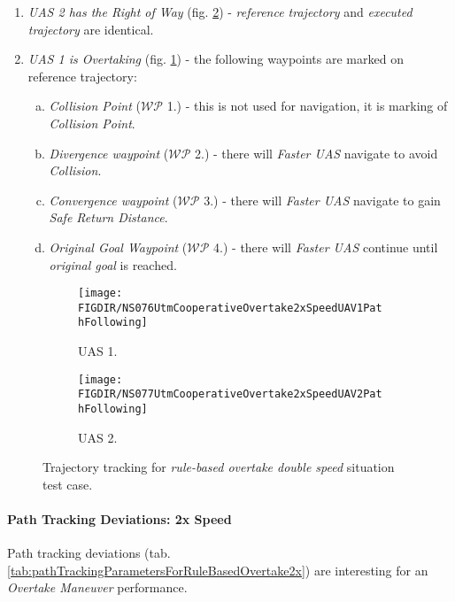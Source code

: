     \begin{enumerate}
        \item \emph{UAS 2 has the Right of Way} (fig. \ref{fig:ruleBasedOvertake2xPathTrackingUAS2}) - \emph{reference trajectory} and \emph{executed trajectory} are identical. 
        
        \item \emph{UAS 1 is Overtaking} (fig. \ref{fig:ruleBasedOvertake2xdPathTrackingUAS1}) - the following waypoints are marked on reference trajectory:
        \begin{enumerate}[a.]
            \item \emph{Collision Point} ($\mathscr{WP}$ 1.) - this is not used for navigation, it is marking of \emph{Collision Point}.
            \item \emph{Divergence waypoint} ($\mathscr{WP}$ 2.) - there will \emph{Faster UAS} navigate to avoid \emph{Collision}.
            \item \emph{Convergence waypoint} ($\mathscr{WP}$ 3.) - there will \emph{Faster UAS} navigate to gain \emph{Safe Return Distance}.
            \item \emph{Original Goal Waypoint} ($\mathscr{WP}$ 4.) - there will \emph{Faster UAS} continue until \emph{original goal} is reached. 
        \end{enumerate}
    \end{enumerate}
    
    \begin{figure}[H]
        \centering
        \begin{subfigure}{0.48\textwidth}
        	\centering
            \texttt{[image: \\FIGDIR/NS076UtmCooperativeOvertake2xSpeedUAV1PathFollowing]}
            \caption{UAS 1.}
            \label{fig:ruleBasedOvertake2xdPathTrackingUAS1}
        \end{subfigure}
        \begin{subfigure}{0.48\textwidth}
        	\centering
            \texttt{[image: \\FIGDIR/NS077UtmCooperativeOvertake2xSpeedUAV2PathFollowing]} 
            \caption{UAS 2.}
            \label{fig:ruleBasedOvertake2xPathTrackingUAS2}
        \end{subfigure}
        \caption{Trajectory tracking for \emph{rule-based overtake double speed} situation test case.}
        \label{fig:testCaseRuleBasedOvertake2xTrajectoryTracking}
    \end{figure}
    
    \paragraph{Path Tracking Deviations: 2x Speed} Path tracking deviations (tab. \ref{tab:pathTrackingParametersForRuleBasedOvertake2x}) are interesting for an \emph{Overtake Maneuver} performance. 
    
